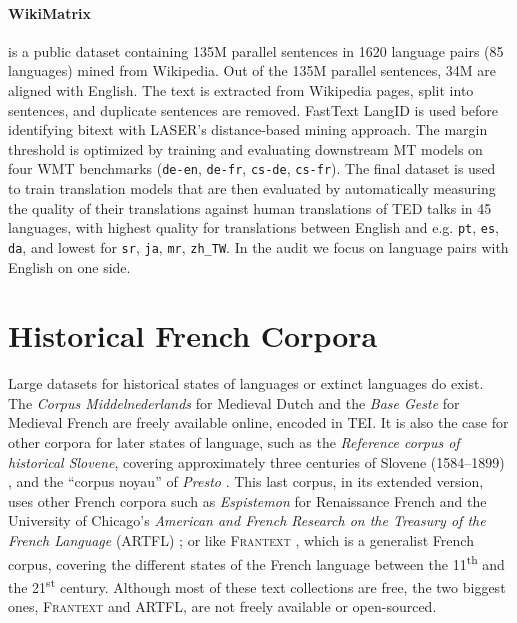 \paragraph{WikiMatrix~\citep{schwenk-etal-2021-wikimatrix}} is a public dataset containing 135M parallel sentences in 1620 language pairs (85 languages) mined from Wikipedia. Out of the 135M parallel sentences, 34M are aligned with English. The text is extracted from Wikipedia pages, split into sentences, and duplicate sentences are removed. FastText LangID is used before identifying bitext with LASER's distance-based mining approach. The margin threshold is optimized by training and evaluating downstream MT models on four WMT benchmarks (\texttt{de-en}, \texttt{de-fr}, \texttt{cs-de}, \texttt{cs-fr}). The final dataset is used to train translation models that are then evaluated by automatically measuring the quality of their translations against human translations of TED talks in 45 languages, with highest quality for translations between English and e.g. \texttt{pt}, \texttt{es}, \texttt{da}, and lowest for \texttt{sr}, \texttt{ja}, \texttt{mr}, \texttt{zh\_TW}. In the audit we focus on language pairs with English on one side.


\section{Historical French Corpora}

Large datasets for historical states of languages or extinct languages do exist. The \emph{Corpus Middelnederlands} for Medieval Dutch \citep{reenen-etal-1998-corpus} and the \emph{Base Geste} for Medieval French \citep{camps-etal-2019-geste} are freely available online, encoded in TEI. It is also the case for other corpora for later states of language, such as the \emph{Reference corpus of historical Slovene}, covering approximately three centuries of Slovene (1584--1899)  \citep{erjavec-2015-reference}, and the ``corpus noyau'' of \emph{Presto} \citep{blumenthal-2018-presto}. This last corpus, in its extended version, uses other French corpora such as \emph{Espistemon} for Renaissance French \citep{demonet-1998-epistemon} and the University of Chicago's \emph{American and French Research on the Treasury of the French Language} (ARTFL) \citep{morrissey-olsen-1991-american}; or like \textsc{Frantext} \citep{atilf-1998-frantext}, which is a generalist French corpus, covering the different states of the French language between the 11\textsuperscript{th} and the 21\textsuperscript{st} century. Although most of these text collections are free, the two biggest ones, \textsc{Frantext} and ARTFL, are not freely available or open-sourced.

